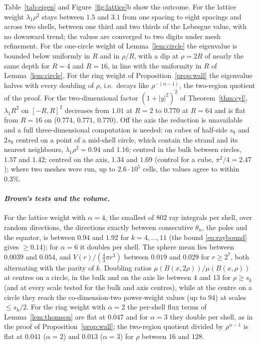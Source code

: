 \documentclass[11pt]{amsart}
\newcommand{\abs}[1]{\lvert #1\rvert}
\theoremstyle{plain}
\theoremstyle{definition}
\theoremstyle{remark}
\begin{document}
Table~\ref{tab:eigen} and Figure~\ref{fig:lattice}b show the outcome. For the
lattice weight $\lambda_1\rho^2$ stays between $1.5$ and $3.1$ from one spacing
to eight spacings and across two shells, between one third and two thirds of the
Lebesgue value, with no downward trend; the values are converged to two digits under
mesh refinement. For the one-circle weight of Lemma~\ref{lem:circle} the
eigenvalue is bounded below uniformly in $R$ and in $\rho/R$, with a dip at
$\rho=2R$ of nearly the same depth for $R=4$ and $R=16$, in line with the
uniformity in $R$ of Lemma~\ref{lem:circle}. For the ring weight of Proposition~\ref{prop:wall} the
eigenvalue halves with every doubling of $\rho$, i.e.\ decays like
$\rho^{-(\alpha-1)}$, the two-region quotient of the proof. For the
two-dimensional factor $(1+\abs y^2)^2$ of Theorem~\ref{thm:cyl},
$\lambda_1R^2$ on $[-R,R]^2$ decreases from $1.01$ at $R=2$ to $0.770$ at $R=64$
and is flat from $R=16$ on ($0.774$, $0.771$, $0.770$). Off the axis the reduction is unavailable and a full
three-dimensional computation is needed: on cubes of half-side $s_8$ and
$2s_8$ centred on a point of a mid-shell circle, which contain the strand and
its nearest neighbours, $\lambda_1\rho^2=0.94$ and $1.16$; centred in the bulk
between circles, $1.57$ and $1.42$; centred on the axis, $1.34$ and $1.69$
(control for a cube, $\pi^2/4=2.47$); where two meshes were run, up to
$2.6\cdot10^5$ cells, the values agree to within $0.3\%$.

\paragraph{\textit{Brown's tests and the volume.}}
For the lattice weight with $\alpha=4$, the smallest of $802$ ray integrals
per shell, over random directions, the directions exactly between consecutive
$\theta_n$, the poles and the equator, is between $0.94$ and $1.92$ for
$k=4,\dots,11$ (the bound \eqref{eq:raybound} gives $\ge0.14$); for $\alpha=6$
it doubles per shell. The sphere mean lies between $0.0039$ and $0.054$, and
$V(r)/(\frac43\pi r^3)$ between $0.019$ and $0.029$ for $r\ge2^7$, both
alternating with the parity of $k$. Doubling ratios
$\mu(B(x,2\rho))/\mu(B(x,\rho))$ at centres on a circle, in the bulk and on the
axis lie between $4$ and $13$ for $\rho\ge s_k$ (and at every scale tested for the
bulk and axis centres), while at the centre on a circle they reach the
co-dimension-two power-weight values (up to $94$) at scales $\le s_k/2$. For the
ring weight with $\alpha=2$ the per-shell flux terms of
Lemma~\ref{lem:thomson} are flat at $0.047$ and for $\alpha=3$ they double per
shell, as in the proof of Proposition~\ref{prop:wall}; the two-region quotient
divided by $\rho^{\alpha-1}$ is flat at $0.041$ ($\alpha=2$) and $0.013$
($\alpha=3$) for $\rho$ between $16$ and $128$.
\end{document}
